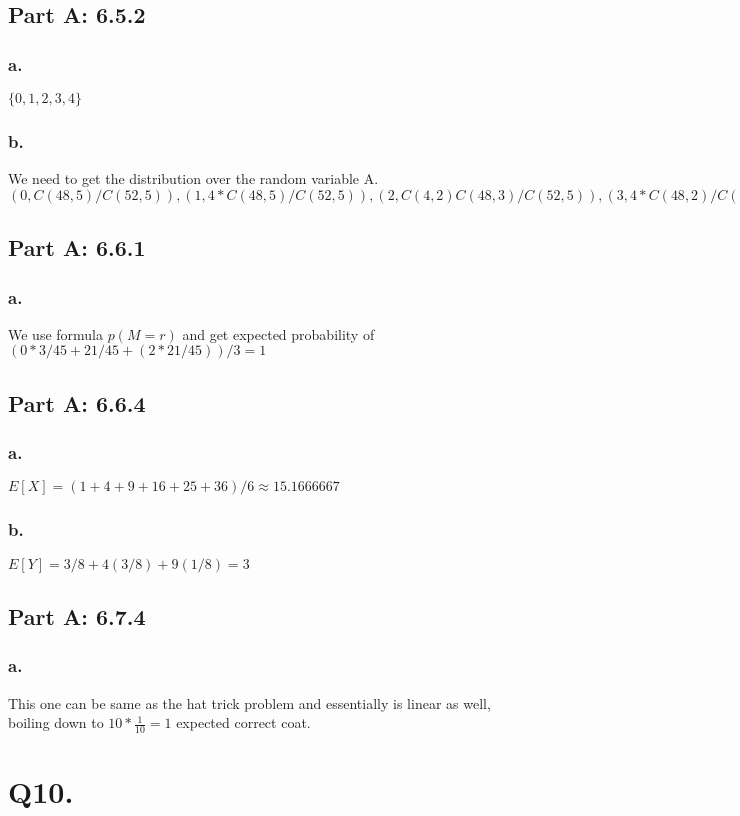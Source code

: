 \documentclass[titlepage]{article}\pagestyle{empty}
\begin{document}
\subsection*{Part A: 6.5.2}
\subsubsection*{a.} $\{ 0, 1, 2, 3, 4 \}$
\subsubsection*{b.} We need to get the distribution over the random variable A. $(0, C(48,5)/C(52,5)),(1, 4 *  C(48,5)/C(52,5)),(2, C(4,2) C(48,3)/C(52,5)),(3, 4 * C(48,2)/C(52,5)),(4, 48/C(52,5))$
\subsection*{Part A: 6.6.1}
\subsubsection*{a.} We use formula $p(M=r)$ and get expected probability of $(0 * 3/45 + 21/45 + (2 * 21/45))/3 = 1$

\subsection*{Part A: 6.6.4}
\subsubsection*{a.} $E[X] = (1+4+9+16+25+36)/6 \approx 15.1666667$
\subsubsection*{b.} $E[Y] = 3/8 + 4(3/8) + 9(1/8) = 3$

\subsection*{Part A: 6.7.4}
\subsubsection*{a.} This one can be same as the hat trick problem and essentially is linear as well, boiling down to $10 * \frac{1}{10} = 1$ expected correct coat.

\pagebreak
\section*{Q10.}
\end{document}
